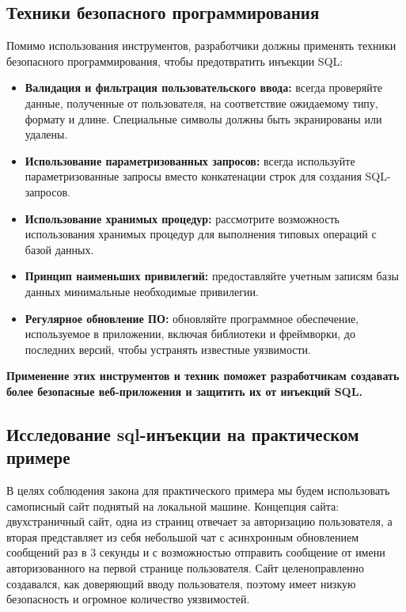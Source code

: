 \documentclass[a4paper,12pt]{diplom}
\begin{document}
	 \subsection{Техники безопасного программирования}
	 
	 Помимо использования инструментов,  разработчики должны применять техники безопасного программирования,  чтобы предотвратить инъекции SQL:
	 
	 \begin{itemize}
	 	\item \textbf{Валидация и фильтрация пользовательского ввода:}  всегда проверяйте данные,  полученные от пользователя,  на соответствие ожидаемому типу,  формату и длине.  Специальные символы должны быть экранированы или удалены. 
	 	\item \textbf{Использование параметризованных запросов:}  всегда используйте параметризованные запросы вместо конкатенации строк для создания SQL-запросов. 
	 	\item \textbf{Использование хранимых процедур:}  рассмотрите возможность использования хранимых процедур для выполнения типовых операций с базой данных. 
	 	\item \textbf{Принцип наименьших привилегий:}  предоставляйте учетным записям базы данных минимальные необходимые привилегии. 
	 	\item \textbf{Регулярное обновление ПО:}  обновляйте программное обеспечение,  используемое в приложении,  включая библиотеки и фреймворки,  до последних версий,  чтобы устранять известные уязвимости. 
	 \end{itemize}
	 	
	 \textbf{Применение этих инструментов и техник поможет разработчикам создавать более безопасные веб-приложения и защитить их от инъекций SQL.} 
	 
	 
	 
	 
	 \subsection{Исследование sql-инъекции на практическом примере}
	 
	 В целях соблюдения закона для практического примера мы будем использовать самописный сайт поднятый на локальной машине. Концепция сайта: двухстраничный сайт, одна из страниц отвечает за авторизацию пользователя, а вторая представляет из себя небольшой чат с асинхронным обновлением сообщений раз в 3 секунды и с возможностью отправить сообщение от имени авторизованного на первой странице пользователя. Сайт целеноправленно создавался, как доверяющий вводу пользователя, поэтому имеет низкую безопасность и огромное количество уязвимостей.
	 
\end{document}
